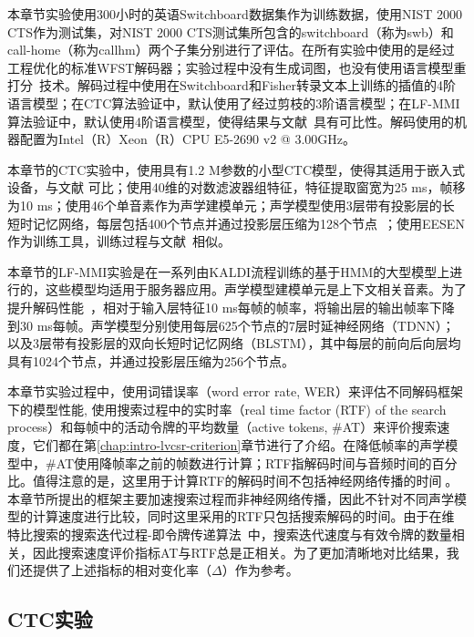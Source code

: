 本章节实验使用300小时的英语Switchboard数据集作为训练数据\cite{godfrey1992switchboard}，使用NIST 2000 CTS作为测试集，对NIST 2000 CTS测试集所包含的switchboard（称为swb）和call-home（称为callhm）两个子集分别进行了评估。在所有实验中使用的是经过工程优化的标准WFST解码器；实验过程中没有生成词图，也没有使用语言模型重打分~\cite{povey2012generating}技术。解码过程中使用在Switchboard和Fisher转录文本上训练的插值的4阶语言模型；在CTC算法验证中，默认使用了经过剪枝的3阶语言模型；在LF-MMI算法验证中，默认使用4阶语言模型，使得结果与文献~\cite{povey2016purely}具有可比性。解码使用的机器配置为Intel（R）Xeon（R）CPU E5-2690 v2 @ 3.00GHz。

本章节的CTC实验中，使用具有1.2 M参数的小型CTC模型，使得其适用于嵌入式设备，与文献 \cite{mcgraw2016personalized}可比；使用40维的对数滤波器组特征，特征提取窗宽为25 ms，帧移为10 ms；使用46个单音素作为声学建模单元；声学模型使用3层带有投影层的长短时记忆网络，每层包括400个节点并通过投影层压缩为128个节点~\cite{sak2014long}；使用EESEN \cite{miao2016ctc}作为训练工具，训练过程与文献~\cite{miao2015eesen}相似。

本章节的LF-MMI实验是在一系列由KALDI流程\cite{povey2011kaldi}训练的基于HMM的大型模型上进行的，这些模型均适用于服务器应用。声学模型建模单元是上下文相关音素。为了提升解码性能~\cite{pundak2016lower,povey2016purely}，相对于输入层特征10 ms每帧的帧率，将输出层的输出帧率下降到30 ms每帧。声学模型分别使用每层625个节点的7层时延神经网络（TDNN）；以及3层带有投影层的双向长短时记忆网络（BLSTM），其中每层的前向后向层均具有1024个节点，并通过投影层压缩为256个节点。

本章节实验过程中，使用词错误率（word error rate, WER）来评估不同解码框架下的模型性能, 使用搜索过程中的实时率（real time factor (RTF) of the search process）和每帧中的活动令牌的平均数量（active tokens, \#AT）来评价搜索速度，它们都在第\ref{chap:intro-lvcsr-criterion}章节进行了介绍。在降低帧率的声学模型中，\#AT使用降帧率之前的帧数进行计算；RTF指解码时间与音频时间的百分比。值得注意的是，这里用于计算RTF的解码时间不包括神经网络传播的时间\cite{you2009parallel,hauswald2015sirius}。本章节所提出的框架主要加速搜索过程而非神经网络传播，因此不针对不同声学模型的计算速度进行比较，同时这里采用的RTF只包括搜索解码的时间。由于在维特比搜索的搜索迭代过程-即令牌传递算法~\cite{hori2013speech}中，搜索迭代速度与有效令牌的数量相关，因此搜索速度评价指标AT与RTF总是正相关。为了更加清晰地对比结果，我们还提供了上述指标的相对变化率（$\Delta$）作为参考。

\subsection{CTC实验}
\label{exp:dsm}

